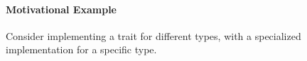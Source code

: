 \begin{frame}{\secname}
	\framesubtitle{Motivational Example}

	Consider implementing a trait %
	for different types, with a specialized implementation for a specific type.


	\begin{figure}[h!]
	\end{figure}

	\pause
	\vspace{-1em}

	\begin{figure}[h!]
	\end{figure}

\end{frame}